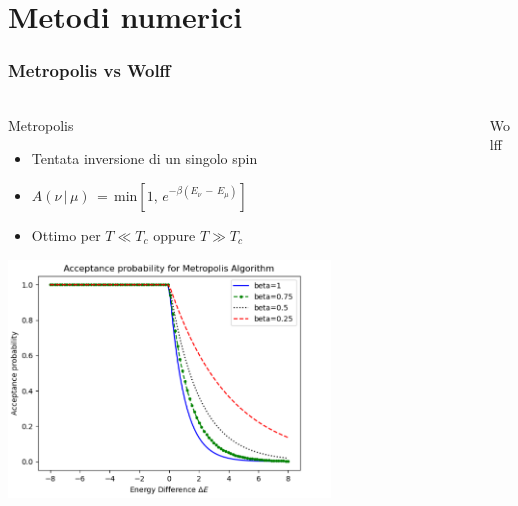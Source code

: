 \section{Metodi numerici}

\begin{frame}
    \frametitle{Metropolis vs Wolff}
    \framesubtitle{}

    \begin{columns}

        \begin{column}{0.5\textwidth}
            \begin{block}{Metropolis}

                \begin{itemize}[itemsep=0.5em, label=$\diamond$]
                    \item Tentata inversione di un singolo spin
                    \item $A\left(\nu\,|\,\mu\right)\,=\,\text{min}\left[1,\,e^{-\beta\left(E_{\nu}\,-\,E_{\mu}\right)}\right]$
                    \item Ottimo per $T \ll T_c$ oppure $T \gg T_c$
                \end{itemize}

                \centering
                \includegraphics[width=0.7\textwidth]{Immagini/metodiNumerici/accRate_metro.png}	
                
            \end{block}
        \end{column}


        \begin{column}{0.5\textwidth}
            \begin{block}{Wolff}


\end{block}
\end{column}
\end{columns}
\end{frame}
